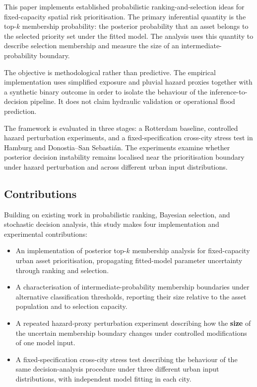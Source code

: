 \documentclass[
]{article}
\providecommand{\tightlist}{%
  \setlength{\itemsep}{0pt}\setlength{\parskip}{0pt}}
\begin{document}
This paper implements established probabilistic ranking-and-selection
ideas for fixed-capacity spatial risk prioritisation. The primary
inferential quantity is the top-\(k\) membership probability: the
posterior probability that an asset belongs to the selected priority set
under the fitted model. The analysis uses this quantity to describe
selection membership and measure the size of an intermediate-probability
boundary.

The objective is methodological rather than predictive. The empirical
implementation uses simplified exposure and pluvial hazard proxies
together with a synthetic binary outcome in order to isolate the
behaviour of the inference-to-decision pipeline. It does not claim
hydraulic validation or operational flood prediction.

The framework is evaluated in three stages: a Rotterdam baseline,
controlled hazard perturbation experiments, and a fixed-specification
cross-city stress test in Hamburg and Donostia--San Sebastián. The
experiments examine whether posterior decision instability remains
localised near the prioritisation boundary under hazard perturbation and
across different urban input distributions.

\subsection{Contributions}\label{contributions}

Building on existing work in probabilistic ranking, Bayesian selection,
and stochastic decision analysis, this study makes four implementation
and experimental contributions:

\begin{itemize}
\tightlist
\item
  An implementation of posterior top-\(k\) membership analysis for
  fixed-capacity urban asset prioritisation, propagating fitted-model
  parameter uncertainty through ranking and selection.
\item
  A characterisation of intermediate-probability membership boundaries
  under alternative classification thresholds, reporting their size
  relative to the asset population and to selection capacity.
\item
  A repeated hazard-proxy perturbation experiment describing how the
  \textbf{size} of the uncertain membership boundary changes under
  controlled modifications of one model input.
\item
  A fixed-specification cross-city stress test describing the behaviour
  of the same decision-analysis procedure under three different urban
  input distributions, with independent model fitting in each city.
\end{itemize}
\end{document}
